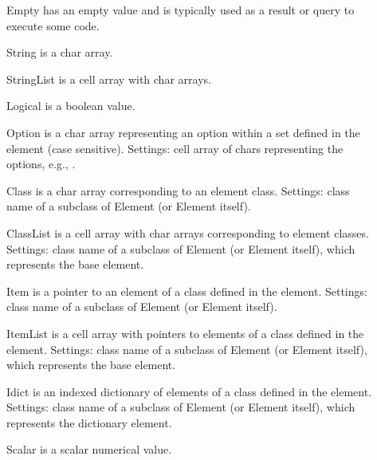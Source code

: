 \documentclass{tufte-handout}
\begin{document}
\begin{fullwidth}
\begin{tcolorbox}[
	title=Property Formats
]
\begin{description} 

\item[] Empty has an empty value and is typically used as a result or query to execute some code. 
 
\item[] String is a char array.
 
\item[] StringList is a cell array with char arrays.
 
\item[] Logical is a boolean value.
 
\item[] Option is a char array representing an option within a set defined in the element (case sensitive).
                Settings: cell array of chars representing the options, e.g., .
 
\item[] Class is a char array corresponding to an element class.
                Settings: class name of a subclass of Element (or Element itself).
 
\item[] ClassList is a cell array with char arrays corresponding to element classes.
                Settings: class name of a subclass of Element (or Element itself), which represents the base element.
 
\item[] Item is a pointer to an element of a class defined in the element.
                Settings: class name of a subclass of Element (or Element itself).
 
\item[] ItemList is a cell array with pointers to elements of a class defined in the element.
                Settings: class name of a subclass of Element (or Element itself), which represents the base element.
 
\item[] Idict is an indexed dictionary of elements of a class defined in the element.
                Settings: class name of a subclass of Element (or Element itself), which represents the dictionary element.
 
\item[] Scalar is a scalar numerical value.
 

\end{description}
\end{tcolorbox}
\end{fullwidth}
\end{document}
